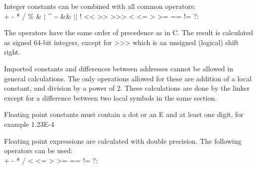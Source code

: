 \documentclass[forwardcom.tex]{subfiles}
\begin{document}
Integer constants can be combined with all common operators: \\
+ \hspace{2mm} - \hspace{2mm} * \hspace{2mm} / \hspace{2mm} \% \hspace{2mm} \& \hspace{2mm} $\vert$ \hspace{2mm} \^{} \hspace{2mm} \textasciitilde \hspace{2mm}
 \&\& \hspace{2mm} $\vert\vert$ \hspace{2mm} ! \hspace{2mm}
\textless\textless \hspace{2mm} \textgreater\textgreater \hspace{2mm} 
\textgreater\textgreater\textgreater \hspace{2mm} 
\textless \hspace{2mm} \textless= \hspace{2mm} \textgreater \hspace{2mm} \textgreater= \hspace{2mm} 
 == \hspace{2mm} != \hspace{2mm} ?: 
\vspace{2mm}

The operators have the same order of precedence as in C.
The result is calculated as signed 64-bit integers, except for \textgreater\textgreater\textgreater \hspace{0.5mm} which is an unsigned (logical) shift right.
\vspace{2mm}

Imported constants and differences between addresses cannot be allowed in general calculations. 
The only operations allowed for these are addition of a local constant, and division by a power of 2.
These calculations are done by the linker except for a difference between two local symbols in the same section.
\vspace{2mm}

Floating point constants must contain a dot or an E and at least one digit, for example 1.23E-4
\vspace{2mm}

Floating point expressions are calculated with double precision. The following operators can be used: \\
+ \hspace{2mm} - \hspace{2mm} * \hspace{2mm} / \hspace{2mm} 
\textless \hspace{2mm} \textless= \hspace{2mm} \textgreater \hspace{2mm} \textgreater= \hspace{2mm} 
 == \hspace{2mm} != \hspace{2mm} ?: 
\vspace{2mm}
\end{document}
